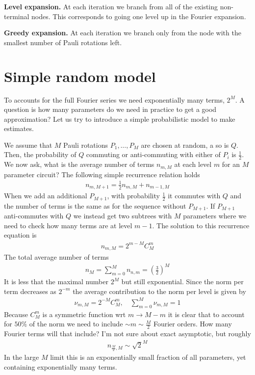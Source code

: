 \documentclass[12 pt]{article}
\begin{document}
\textbf{Level expansion.} At each iteration we branch from all of the existing non-terminal nodes. This corresponds to going one level up in the Fourier expansion.

\textbf{Greedy expansion.} At each iteration we branch only from the node with the smallest number of Pauli rotations left.

\section{Simple random model}
To accounts for the full Fourier series we need exponentially many terms, $2^M$. A question is how many parameters do we need in practice to get a good approximation? Let us try to introduce a simple probabilistic model to make estimates.

We assume that $M$ Pauli rotations $P_1,\dots, P_M$ are chosen at random, a so is $Q$. Then, the probability of $Q$ commuting or anti-commuting with either of $P_i$ is $\frac12$. We now ask, what is the average number of terms $n_{m,M}$ at each level $m$ for an $M$ parameter circuit? The following simple recurrence relation holds
\begin{align}
	n_{m,M+1}=\frac12 n_{m, M}+n_{m-1,M}
\end{align}
When we add an additional $P_{M+1}$, with probability $\frac12$ it commutes with $Q$ and the number of terms is the same as for the sequence without $P_{M+1}$. If $P_{M+1}$ anti-commutes with $Q$ we instead get two subtrees with $M$ parameters where we need to check how many terms are at level $m-1$. The solution to this recurrence equation is
\begin{align}
	n_{m,M}=2^{m-M} C_M^m 
\end{align}
The total average number of terms
\begin{align}
	n_M=\sum_{m=0}^Mn_{n,m}=\left(\frac32\right)^M
\end{align}
It is less that the maximal number $2^M$ but still exponential. Since the norm per term decreases as $2^{-m}$ the average contribution to the norm per level is given by
\begin{align}
	\nu_{m,M}=2^{-M}C_M^m,\quad \sum_{m=0}^M\nu_{m,M}=1
\end{align}
Because $C_M^m$ is a symmetric function wrt $m\to M-m$ it is clear that to account for $50\%$ of the norm we need to include $\sim m\sim \frac{M}{2}$ Fourier orders. How many Fourier terms will that include? I'm not sure about exact asymptotic, but roughly
\begin{align}
	n_{\frac{M}{2},M}\sim \sqrt{2}^M
\end{align}
In the large $M$ limit this is an exponentially small fraction of all parameters, yet containing exponentially many terms.
\end{document}
